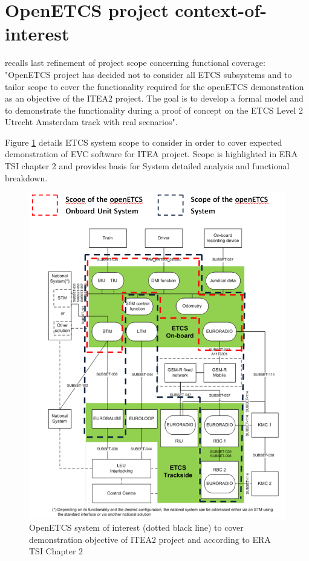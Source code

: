\documentclass[11pt]{template/openetcs_report}
\begin{document}
\section{OpenETCS project context-of-interest}
\label{OpenETCS_ITEAProjectScope}
\cite{D3.5.3} recalls last refinement of project scope concerning functional coverage: "OpenETCS project has decided not to consider all ETCS subsystems and to tailor scope to cover the functionality required for the openETCS demonstration as an objective of the ITEA2 project. The goal is to develop a formal model and to demonstrate the functionality during a proof of concept on the ETCS Level 2 Utrecht Amsterdam track with real scenarios".

Figure \ref{fig:openETCSSystemOfInterest} details ETCS system scope to consider in order to cover expected demonstration of EVC software for ITEA project. Scope is highlighted in ERA TSI chapter 2 and provides basis for System detailed analysis and functional breakdown.

\begin{figure}[htbp]
\centering
\includegraphics[width=.9\linewidth]{./images/ArchitectureSRS.PNG}
\caption{\label{fig:openETCSSystemOfInterest}OpenETCS system of interest (dotted black line) to cover demonstration objective of ITEA2 project and according to ERA TSI Chapter 2}
\end{figure}
\end{document}
